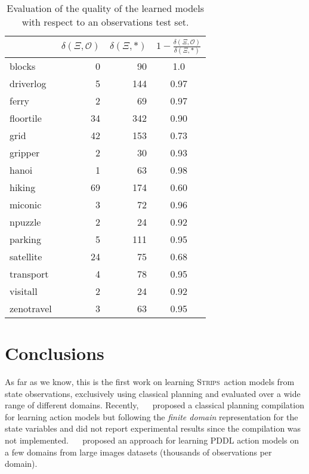 \documentclass{article}
\newcommand{\strips}{\textsc{Strips}}     %
\begin{document}
\begin{table}
		\begin{center}
                \begin{footnotesize}
			\begin{tabular}{l|r|r|c|}
				& $\delta(\Xi,\mathcal{O})$ & $\delta(\Xi,*)$ & $1-\frac{\delta(\Xi,\mathcal{O})}{\delta(\Xi,*)}$ \\
				\hline
				blocks & 0 & 90 & 1.0 \\
				driverlog & 5 & 144 & 0.97 \\
				ferry & 2 & 69 & 0.97 \\
				floortile & 34 & 342 & 0.90 \\
				grid & 42 & 153 & 0.73 \\
				gripper & 2 & 30 & 0.93 \\
				hanoi & 1 & 63 & 0.98 \\
				hiking & 69 & 174 & 0.60 \\
				miconic & 3 & 72 & 0.96 \\
				npuzzle & 2 & 24 & 0.92 \\
				parking & 5 & 111 & 0.95 \\
				satellite & 24 & 75 & 0.68 \\
				transport & 4 & 78 & 0.95 \\
				visitall & 2 & 24 & 0.92 \\
				zenotravel & 3 & 63 & 0.95
			\end{tabular}
                        	\end{footnotesize}
		\end{center}
	\caption{\small Evaluation of the quality of the learned models with respect to an observations test set.}
	\label{fig:observationstest}                
\end{table}

\section{Conclusions}
As far as we know, this is the first work on learning \strips\ action models from state observations, exclusively using classical planning and evaluated over a wide range of different domains. Recently, ~\citeauthor{stern2017efficient}~\citeyear{stern2017efficient} proposed a classical planning compilation for learning action models but following the {\em finite domain} representation for the state variables and did not report experimental results since the compilation was not implemented. ~\citeauthor{asai2017classical}~\citeyear{asai2017classical} proposed an approach for learning PDDL action models on a few domains from large images datasets (thousands of observations per domain). 
\end{document}
